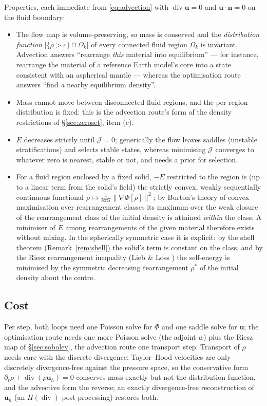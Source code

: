\documentclass[11pt]{article}
\newcommand{\Jf}{\mathscr{J}}  %
\newcommand{\bu}{\mathbf{u}}
\newcommand{\bn}{\mathbf{n}}
\renewcommand{\div}{\operatorname{div}}
\newcommand{\norm}[1]{\lVert #1 \rVert}
\begin{document}
Properties, each immediate from \eqref{eq:advection} with
$\div\bu = 0$ and $\bu\cdot\bn = 0$ on the fluid boundary:
\begin{itemize}
\item The flow map is volume-preserving, so mass is conserved and the
  \emph{distribution function} $|\{\rho > c\}\cap\Omega_k|$ of every
  connected fluid region $\Omega_k$ is invariant. Advection answers
  ``rearrange \emph{this} material into equilibrium'' --- for instance,
  rearrange the material of a reference Earth model's core into a state
  consistent with an aspherical mantle --- whereas the optimisation route
  answers ``find \emph{a} nearby equilibrium density''.
\item Mass cannot move between disconnected fluid regions, and the
  per-region distribution is fixed: this is the advection route's form of
  the density restrictions of \S\ref{sec:zeroset}, item (c).
\item $E$ decreases strictly until $\Jf  = 0$; generically the flow leaves
  saddles (unstable stratifications) and selects stable states, whereas
  minimising $\Jf $ converges to whatever zero is nearest, stable or not,
  and needs a prior for selection.
\item For a fluid region enclosed by a fixed solid, $-E$ restricted to
  the region is (up to a linear term from the solid's field) the strictly
  convex, weakly sequentially continuous functional
  $\rho\mapsto\frac{1}{8\pi G}\norm{\nabla\Phi[\rho]}^2$; by Burton's
  theory of convex maximisation over rearrangement classes
  \cite{Burton1987} its maximum over the weak closure of the
  rearrangement class of the initial density is attained \emph{within}
  the class. A minimiser of $E$ among rearrangements of the given
  material therefore exists without mixing. In the spherically symmetric
  case it is explicit: by the shell theorem (Remark~\ref{rem:shell}) the
  solid's term is constant on the class, and by the Riesz rearrangement
  inequality (Lieb \& Loss \cite[Thm.~3.7]{LiebLoss}) the self-energy is
  minimised by the symmetric decreasing rearrangement $\rho^{*}$ of the
  initial density about the centre.
\end{itemize}

\subsection{Cost}

Per step, both loops need one Poisson solve for $\Phi$ and one saddle
solve for $\bu$; the optimisation route needs one more Poisson solve (the
adjoint $w$) plus the Riesz map of \S\ref{sec:sobolev}, the advection
route one transport step. Transport of $\rho$ needs care with the
discrete divergence: Taylor--Hood velocities are only discretely
divergence-free against the pressure space, so the conservative form
$\partial_t\rho + \div(\rho\bu_h) = 0$ conserves mass exactly but not the
distribution function, and the advective form the reverse; an
exactly divergence-free reconstruction of $\bu_h$ (an $H(\div)$
post-processing) restores both.
\end{document}
